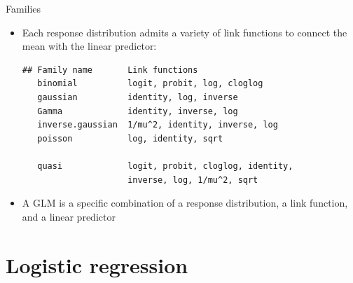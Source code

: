 \documentclass[aspectratio=169]{beamer}
\begin{document}
\begin{frame}[fragile]{Families}
  \begin{itemize}
    \item Each response distribution admits a variety of link functions to
      connect the mean with the linear predictor:

  \begin{lstlisting}
## Family name       Link functions
   binomial          logit, probit, log, cloglog
   gaussian          identity, log, inverse
   Gamma             identity, inverse, log
   inverse.gaussian  1/mu^2, identity, inverse, log
   poisson           log, identity, sqrt

   quasi             logit, probit, cloglog, identity,
                     inverse, log, 1/mu^2, sqrt
\end{lstlisting}
\item A GLM is a specific combination of a response distribution, a link
  function, and a linear predictor
  \end{itemize}
\end{frame}

\section{Logistic regression}
\end{document}
